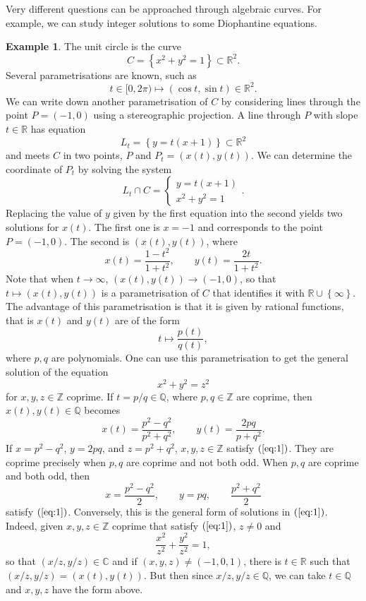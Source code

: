 \documentclass{article}
\newcommand{\Z}{\mathbb{Z}}
\newcommand{\Q}{\mathbb{Q}}
\newcommand{\R}{\mathbb{R}}
\newcommand{\C}{\mathbb{C}}
\newcommand{\rb}[1]{\left( #1 \right)}
\newcommand{\cb}[1]{\left\{ #1 \right\}}
\theoremstyle{definition}\newtheorem{definition}{Definition}[section]
\theoremstyle{definition}\newtheorem{notation}[definition]{Notation}
\theoremstyle{definition}\newtheorem{remark}[definition]{Remark}
\theoremstyle{definition}\newtheorem{example}[definition]{Example}
\theoremstyle{definition}\newtheorem{fact}{Fact}
\theoremstyle{definition}\newtheorem{exercise}{Exercise}
\begin{document}
Very different questions can be approached through algebraic curves. For example, we can study integer solutions to some Diophantine equations.

\begin{example}
The unit circle is the curve
$$ C = \cb{x^2 + y^2 = 1} \subset \R^2. $$
Several parametrisations are known, such as
$$ t \in [0, 2\pi) \mapsto \rb{\cos t, \sin t} \in \R^2. $$
We can write down another parametrisation of $ C $ by considering lines through the point $ P = \rb{-1, 0} $ using a stereographic projection. A line through $ P $ with slope $ t \in \R $ has equation
$$ L_t = \cb{y = t\rb{x + 1}} \subset \R^2 $$
and meets $ C $ in two points, $ P $ and $ P_t = \rb{x\rb{t}, y\rb{t}} $. We can determine the coordinate of $ P_t $ by solving the system
$$ L_t \cap C = \begin{cases} y = t\rb{x + 1} \\ x^2 + y^2 = 1 \end{cases}. $$
Replacing the value of $ y $ given by the first equation into the second yields two solutions for $ x\rb{t} $. The first one is $ x = -1 $ and corresponds to the point $ P = \rb{-1, 0} $. The second is $ \rb{x\rb{t}, y\rb{t}} $, where
$$ x\rb{t} = \dfrac{1 - t^2}{1 + t^2}, \qquad y\rb{t} = \dfrac{2t}{1 + t^2}. $$
Note that when $ t \to \infty $, $ \rb{x\rb{t}, y\rb{t}} \to \rb{-1, 0} $, so that $ t \mapsto \rb{x\rb{t}, y\rb{t}} $ is a parametrisation of $ C $ that identifies it with $ \R \cup \cb{\infty} $. The advantage of this parametrisation is that it is given by rational functions, that is $ x\rb{t} $ and $ y\rb{t} $ are of the form
$$ t \mapsto \dfrac{p\rb{t}}{q\rb{t}}, $$
where $ p, q $ are polynomials. One can use this parametrisation to get the general solution of the equation
\begin{equation}
\label{eq:1}
x^2 + y^2 = z^2
\end{equation}
for $ x, y, z \in \Z $ coprime. If $ t = p / q \in \Q $, where $ p, q \in \Z $ are coprime, then $ x\rb{t}, y\rb{t} \in \Q $ becomes
$$ x\rb{t} = \dfrac{p^2 - q^2}{p^2 + q^2}, \qquad y\rb{t} = \dfrac{2pq}{p + q^2}. $$
If $ x = p^2 - q^2 $, $ y = 2pq $, and $ z = p^2 + q^2 $, $ x, y, z \in \Z $ satisfy $ \rb{\ref{eq:1}} $. They are coprime precisely when $ p, q $ are coprime and not both odd. When $ p, q $ are coprime and both odd, then
$$ x = \dfrac{p^2 - q^2}{2}, \qquad y = pq, \qquad \dfrac{p^2 + q^2}{2} $$
satisfy $ \rb{\ref{eq:1}} $. Conversely, this is the general form of solutions in $ \rb{\ref{eq:1}} $. Indeed, given $ x, y, z \in \Z $ coprime that satisfy $ \rb{\ref{eq:1}} $, $ z \ne 0 $ and
$$ \dfrac{x^2}{z^2} + \dfrac{y^2}{z^2} = 1, $$
so that $ \rb{x / z, y / z} \in \C $ and if $ \rb{x, y, z} \ne \rb{-1, 0, 1} $, there is $ t \in \R $ such that $ \rb{x / z, y / z} = \rb{x\rb{t}, y\rb{t}} $. But then since $ x / z, y / z \in \Q $, we can take $ t \in \Q $ and $ x, y, z $ have the form above.
\end{example}
\end{document}
